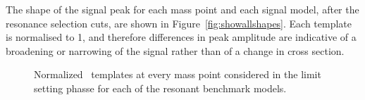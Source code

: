 The shape of the signal peak for each mass point and each signal model, after the resonance selection cuts, are shown in Figure~\ref{fig:showallshapes}. Each template is normalised to 1, and therefore differences in peak amplitude are indicative of a broadening or narrowing of the signal rather than of a change in cross section.
\begin{figure}[!htb]
\centering
{}
\caption{Normalized \mjj\ templates at every mass point considered in the limit setting phasse for each of the resonant benchmark models. }

\end{figure}

